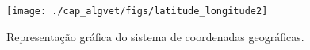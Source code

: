 


\begin{figure}%
\begin{center}
\texttt{[image: ./cap\_algvet/figs/latitude\_longitude2]}
      \caption{Representação gráfica do sistema de coordenadas geográficas.}
      \label{fig:latlong}
      \end{center}
  \end{figure}

